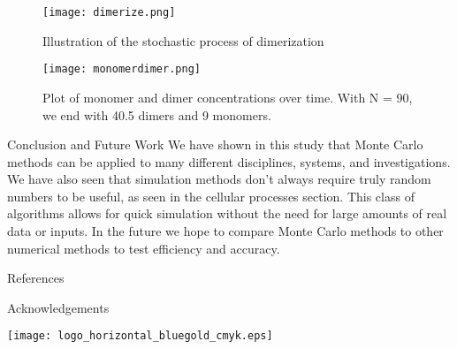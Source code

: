 \documentclass[final]{beamer}
\newlength{\onecolwid}
\begin{document}
\begin{frame}[t]
\begin{columns}[t]
\begin{column}{\onecolwid} %
\begin{figure}
\texttt{[image: dimerize.png]}
\caption{Illustration of the stochastic process of dimerization}
\end{figure}

\begin{figure}
\texttt{[image: monomerdimer.png]}
\caption{Plot of monomer and dimer concentrations over time. With N = 90, we end with 40.5 dimers and 9 monomers.}
\end{figure}



\begin{block}{Conclusion and Future Work}
We have shown in this study that Monte Carlo methods can be applied to many different disciplines, systems, and investigations. We have also seen that simulation methods don't always require truly random numbers to be useful, as seen in the cellular processes section. This class of algorithms allows for quick simulation without the need for large amounts of real data or inputs. In the future we hope to compare Monte Carlo methods to other numerical methods to test efficiency and accuracy.
\end{block}

\begin{block}{References}
\nocite{*} %
\small{
\vspace{0.0001in}}
\end{block}


\begin{block}{Acknowledgements}
\small{}
\begin{center}
\texttt{[image: logo\_horizontal\_bluegold\_cmyk.eps]}
\end{center}
\end{block}


\end{column}
\end{columns}
\end{frame}
\end{document}
